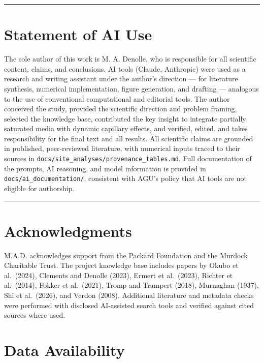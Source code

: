 \documentclass[12pt]{article}
\begin{document}
\begin{center}\rule{0.5\linewidth}{0.5pt}\end{center}

\section{Statement of AI Use}\label{statement-of-ai-use}

The sole author of this work is M. A. Denolle, who is responsible for
all scientific content, claims, and conclusions. AI tools (Claude,
Anthropic) were used as a research and writing assistant under the
author's direction --- for literature synthesis, numerical
implementation, figure generation, and drafting --- analogous to the use
of conventional computational and editorial tools. The author conceived
the study, provided the scientific direction and problem framing,
selected the knowledge base, contributed the key insight to integrate
partially saturated media with dynamic capillary effects, and verified,
edited, and takes responsibility for the final text and all results. All
scientific claims are grounded in published, peer-reviewed literature,
with numerical inputs traced to their sources in
\texttt{docs/site\_analyses/provenance\_tables.md}. Full documentation
of the prompts, AI reasoning, and model information is provided in
\texttt{docs/ai\_documentation/}, consistent with AGU's policy that AI
tools are not eligible for authorship.

\begin{center}\rule{0.5\linewidth}{0.5pt}\end{center}

\section{Acknowledgments}\label{acknowledgments}

M.A.D. acknowledges support from the Packard Foundation and the Murdock
Charitable Trust. The project knowledge base includes papers by Okubo et
al.~(2024), Clements and Denolle (2023), Ermert et al.~(2023), Richter
et al.~(2014), Fokker et al.~(2021), Tromp and Trampert (2018),
Murnaghan (1937), Shi et al.~(2026), and Verdon (2008). Additional
literature and metadata checks were performed with disclosed AI-assisted
search tools and verified against cited sources where used.

\section{Data Availability}\label{data-availability}
\end{document}
